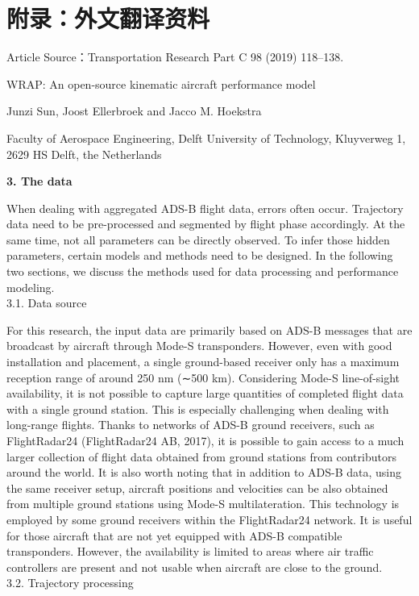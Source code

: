 \documentclass[a4paper,punct,space,heading=true,AutoFakeBold]{ctexrep}
\newcommand{\sanhao}{\fontsize{15.75pt}{\baselineskip}\selectfont}
\newcommand{\xiaosi}{\fontsize{12pt}{\baselineskip}\selectfont}
\newcommand{\wuhao}{\fontsize{10.5pt}{\baselineskip}\selectfont}
\begin{document}
\thispagestyle{plain}
\chapter*{附录：外文翻译资料}
\markboth{}{}
\begin{flushleft}
	\setlength\abovedisplayskip{18pt}
	Article Source：Transportation Research Part C 98 (2019) 118–138.
	\setlength{\baselineskip}{20pt}
	\setlength\belowdisplayskip{18pt}
\end{flushleft}

\begin{center}
	\setlength\abovedisplayskip{18pt}
	\setlength{\baselineskip}{20pt}
	\sanhao WRAP: An open-source kinematic aircraft performance model
	\setlength\belowdisplayskip{18pt}
\end{center}

\begin{center}
	\wuhao
	Junzi Sun, Joost Ellerbroek and Jacco M. Hoekstra
	
	Faculty of Aerospace Engineering, Delft University of Technology, Kluyverweg 1, 2629 HS Delft, the Netherlands
\end{center}


{
	\noindent\xiaosi\bfseries{3. The data}
}

When dealing with aggregated ADS-B flight data, errors often occur. Trajectory data need to be pre-processed and segmented by flight phase accordingly. At the same time, not all parameters can be directly observed. To infer those hidden parameters, certain models and methods need to be designed. In the following two sections, we discuss the methods used for data processing and performance modeling.\\
3.1. Data source

For this research, the input data are primarily based on ADS-B messages that are broadcast by aircraft through Mode-S transponders. However, even with good installation and placement, a single ground-based receiver only has a maximum reception range of around 250 nm (∼500 km). Considering Mode-S line-of-sight availability, it is not possible to capture large quantities of completed flight data with a single ground station. This is especially challenging when dealing with long-range flights. Thanks to networks of ADS-B ground receivers, such as FlightRadar24 (FlightRadar24 AB, 2017), it is possible to gain access to a much larger collection of flight data obtained from ground stations from contributors around the world.
It is also worth noting that in addition to ADS-B data, using the same receiver setup, aircraft positions and velocities can be also obtained from multiple ground stations using Mode-S multilateration. This technology is employed by some ground receivers within the FlightRadar24 network. It is useful for those aircraft that are not yet equipped with ADS-B compatible transponders. However, the availability is limited to areas where air traffic controllers are present and not usable when aircraft are close to the ground.\\
3.2. Trajectory processing
\end{document}
